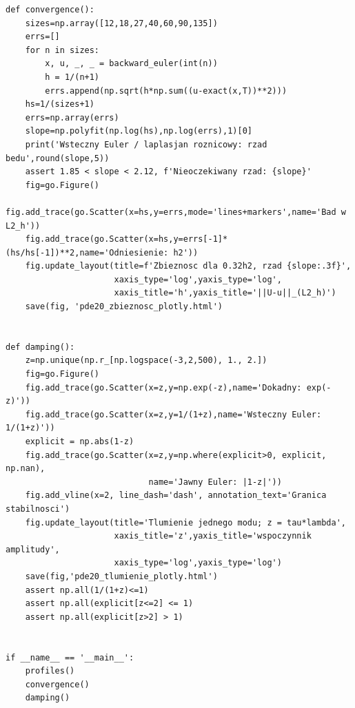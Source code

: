 \begin{lstlisting}[style=pythonpde,caption={Niejawny schemat cieplny, zbieżność i tłumienie modów (Plotly)},label={code:pde20-plotly}]
def convergence():
    sizes=np.array([12,18,27,40,60,90,135])
    errs=[]
    for n in sizes:
        x, u, _, _ = backward_euler(int(n))
        h = 1/(n+1)
        errs.append(np.sqrt(h*np.sum((u-exact(x,T))**2)))
    hs=1/(sizes+1)
    errs=np.array(errs)
    slope=np.polyfit(np.log(hs),np.log(errs),1)[0]
    print('Wsteczny Euler / laplasjan roznicowy: rzad bedu',round(slope,5))
    assert 1.85 < slope < 2.12, f'Nieoczekiwany rzad: {slope}'
    fig=go.Figure()
    fig.add_trace(go.Scatter(x=hs,y=errs,mode='lines+markers',name='Bad w L2_h'))
    fig.add_trace(go.Scatter(x=hs,y=errs[-1]*(hs/hs[-1])**2,name='Odniesienie: h2'))
    fig.update_layout(title=f'Zbieznosc dla 0.32h2, rzad {slope:.3f}',
                      xaxis_type='log',yaxis_type='log',
                      xaxis_title='h',yaxis_title='||U-u||_(L2_h)')
    save(fig, 'pde20_zbieznosc_plotly.html')


def damping():
    z=np.unique(np.r_[np.logspace(-3,2,500), 1., 2.])
    fig=go.Figure()
    fig.add_trace(go.Scatter(x=z,y=np.exp(-z),name='Dokadny: exp(-z)'))
    fig.add_trace(go.Scatter(x=z,y=1/(1+z),name='Wsteczny Euler: 1/(1+z)'))
    explicit = np.abs(1-z)
    fig.add_trace(go.Scatter(x=z,y=np.where(explicit>0, explicit, np.nan),
                             name='Jawny Euler: |1-z|'))
    fig.add_vline(x=2, line_dash='dash', annotation_text='Granica stabilnosci')
    fig.update_layout(title='Tlumienie jednego modu; z = tau*lambda',
                      xaxis_title='z',yaxis_title='wspoczynnik amplitudy',
                      xaxis_type='log',yaxis_type='log')
    save(fig,'pde20_tlumienie_plotly.html')
    assert np.all(1/(1+z)<=1)
    assert np.all(explicit[z<=2] <= 1)
    assert np.all(explicit[z>2] > 1)


if __name__ == '__main__':
    profiles()
    convergence()
    damping()
\end{lstlisting}


